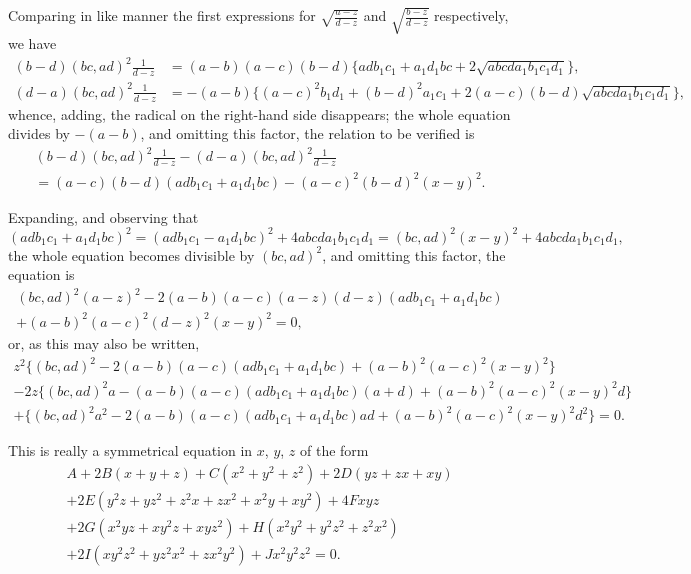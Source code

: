 \documentclass[11pt,a4paper]{article}
\begin{document}
Comparing in like manner the first expressions for $\sqrt{\frac{a - z}{d - z}}$ and $\sqrt{\frac{b - z}{d - z}}$ respectively, we have
\begin{align*}
(b - d)(bc, ad)^2 \frac{1}{d - z} &= (a - b)(a - c)(b - d)\{adb_1c_1 + a_1d_1bc + 2\sqrt{abcda_1b_1c_1d_1}\}, \\
(d - a)(bc, ad)^2 \frac{1}{d - z} &= -(a - b)\{(a - c)^2b_1d_1 + (b - d)^2a_1c_1 + 2(a - c)(b - d)\sqrt{abcda_1b_1c_1d_1}\},
\end{align*}
whence, adding, the radical on the right-hand side disappears; the whole equation divides by $-(a - b)$, and omitting this factor, the relation to be verified is
\begin{multline*}
(b - d)(bc, ad)^2 \frac{1}{d - z} - (d - a)(bc, ad)^2 \frac{1}{d - z} \\
= (a - c)(b - d)(adb_1c_1 + a_1d_1bc) - (a - c)^2(b - d)^2(x - y)^2.
\end{multline*}

\clearpage
Expanding, and observing that
\[
(adb_1c_1 + a_1d_1bc)^2 = (adb_1c_1 - a_1d_1bc)^2 + 4abcda_1b_1c_1d_1 = (bc, ad)^2(x - y)^2 + 4abcda_1b_1c_1d_1,
\]
the whole equation becomes divisible by $(bc, ad)^2$, and omitting this factor, the equation is
\begin{multline*}
(bc, ad)^2(a - z)^2 - 2(a - b)(a - c)(a - z)(d - z)(adb_1c_1 + a_1d_1bc) \\
+ (a - b)^2(a - c)^2(d - z)^2(x - y)^2 = 0,
\end{multline*}
or, as this may also be written,
\begin{multline*}
z^2\{(bc, ad)^2 - 2(a - b)(a - c)(adb_1c_1 + a_1d_1bc) + (a - b)^2(a - c)^2(x - y)^2\} \\
- 2z\{(bc, ad)^2a - (a - b)(a - c)(adb_1c_1 + a_1d_1bc)(a + d) + (a - b)^2(a - c)^2(x - y)^2d\} \\
+ \{(bc, ad)^2a^2 - 2(a - b)(a - c)(adb_1c_1 + a_1d_1bc)ad + (a - b)^2(a - c)^2(x - y)^2d^2\} = 0.
\end{multline*}

\clearpage
This is really a symmetrical equation in $x$, $y$, $z$ of the form
\begin{multline*}
A + 2B(x + y + z) + C(x^2 + y^2 + z^2) + 2D(yz + zx + xy) \\
+ 2E(y^2z + yz^2 + z^2x + zx^2 + x^2y + xy^2) + 4Fxyz \\
+ 2G(x^2yz + xy^2z + xyz^2) + H(x^2y^2 + y^2z^2 + z^2x^2) \\
+ 2I(xy^2z^2 + yz^2x^2 + zx^2y^2) + Jx^2y^2z^2 = 0.
\end{multline*}
\end{document}
